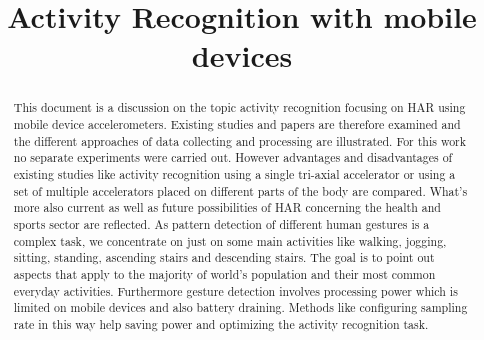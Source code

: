 \documentclass[conference]{IEEEtran}
\begin{document}
\title{Activity Recognition with mobile devices\\
}

\author{
\and
{}
\and
{}
}

\maketitle

\begin{abstract}
This document is a discussion on the topic activity recognition focusing on \ac{HAR} using mobile device accelerometers. Existing studies and papers are therefore examined and the different approaches of data collecting and processing are illustrated. For this work no separate experiments were carried out. However advantages and disadvantages of existing studies like activity recognition using a single tri-axial accelerator or using a set of multiple accelerators placed on different parts of the body are compared. What's more also current as well as future possibilities of \ac{HAR} concerning the health and sports sector are reflected. As pattern detection of different human gestures is a complex task, we concentrate on just on some main activities like walking, jogging, sitting, standing, ascending stairs and descending stairs. The goal is to point out aspects that apply to the majority of world's population and their most common everyday activities. Furthermore gesture detection involves processing power which is limited on mobile devices and also battery draining. Methods like configuring sampling rate in this way help saving power and optimizing the activity recognition task.
\color{red}{*CRITICAL: Do Not Use Symbols, Special Characters, Footnotes, 
or Math in Paper Title or Abstract.}
\end{abstract}
\end{document}
